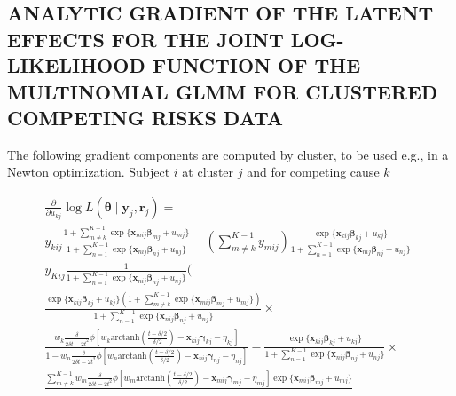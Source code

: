 \documentclass[12pt, %
               openright, %
               oneside, %
               a4paper, %
               chapter=TITLE, %
               section=TITLE, %
               brazil,
               english %
]{abntex2}
\renewcommand{\ABNTEXchapterfontsize}{\bfseries\large}
\begin{document}
\begin{apendicesenv}
\partapendices
{}
\renewcommand{\ABNTEXchapterfontsize}{\ABNTEXsectionfont}

\chapter{ANALYTIC GRADIENT OF THE LATENT EFFECTS FOR THE JOINT
         LOG-LIKELIHOOD FUNCTION OF THE MULTINOMIAL GLMM FOR CLUSTERED
         COMPETING RISKS DATA}
\label{cap:appendixA}

The following gradient components are computed by cluster, to be used
e.g., in a Newton optimization. Subject \(i\) at cluster \(j\) and for
competing cause \(k\)

\begin{align*}
  &\frac{\partial}{\partial u_{kj}}
    \log L(\bm{\theta}\mid\bm{y}_{j}, \bm{r}_{j}) =\\
  &y_{kij}\frac{1 +
    \sum_{m \neq k}^{K-1}\exp\{\bm{x}_{mij}\bm{\beta}_{mj} + u_{mj}\}
    }{1 +
    \sum_{n = 1}^{K-1}\exp\{\bm{x}_{nij}\bm{\beta}_{nj} + u_{nj}\}} -
    \left(\sum_{m \neq k}^{K-1} y_{mij}\right)
    \frac{\exp\{\bm{x}_{kij}\bm{\beta}_{kj} + u_{kj}\}
    }{1 +
    \sum_{n = 1}^{K-1}\exp\{\bm{x}_{nij}\bm{\beta}_{nj} + u_{nj}\}}-\\
  &y_{Kij}\frac{1}{1 +
    \sum_{n = 1}^{K-1}\exp\{\bm{x}_{nij}\bm{\beta}_{nj} + u_{nj}\}
    }\Bigg(\\
  &\frac{\exp\{\bm{x}_{kij}\bm{\beta}_{kj} + u_{kj}\}
    \left(1 +
    \sum_{m \neq k}^{K-1}\exp\{\bm{x}_{mij}\bm{\beta}_{mj} + u_{mj}\}
    \right)}{
    1 + \sum_{n = 1}^{K-1}\exp\{\bm{x}_{nij}\bm{\beta}_{nj} + u_{nj}\}
    }\times\\
  &\frac{w_{k}\frac{\delta}{2\delta t - 2t^{2}}
    \phi[w_{k}\text{arctanh}\left(\frac{t-\delta/2}{\delta/2}\right)
    - \bm{x}_{kij}\bm{\gamma}_{kj} - \eta_{kj}
    ]}{1 - w_{n}\frac{\delta}{2\delta t - 2t^{2}}
    \phi[w_{n}\text{arctanh}\left(\frac{t-\delta/2}{\delta/2}\right)
    - \bm{x}_{nij}\bm{\gamma}_{nj} - \eta_{nj}]} -
    \frac{\exp\{\bm{x}_{kij}\bm{\beta}_{kj} + u_{kj}\}}{
    1 + \sum_{n = 1}^{K-1}\exp\{\bm{x}_{nij}\bm{\beta}_{nj} + u_{nj}\}}
    \times\\
  &\frac{
    \sum_{m \neq k}^{K-1}
    w_{m}\frac{\delta}{2\delta t - 2t^{2}}
    \phi[w_{m}\text{arctanh}\left(\frac{t-\delta/2}{\delta/2}\right)
    - \bm{x}_{mij}\bm{\gamma}_{mj} - \eta_{mj}]
    \exp\{\bm{x}_{mij}\bm{\beta}_{mj} + u_{mj}\}}{
}
\end{align*}
\end{apendicesenv}
\end{document}
